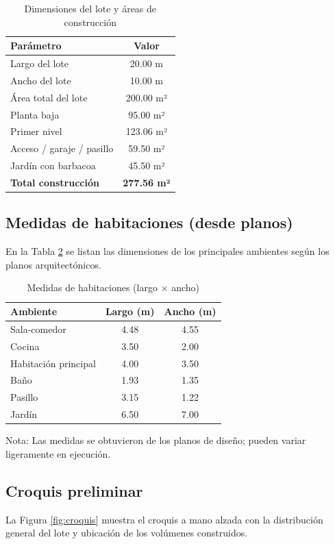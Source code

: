 \begin{table}[h]
\centering
\caption{Dimensiones del lote y áreas de construcción}
\label{tab:lot}
\begin{tabular}{|l|c|}
\hline
\textbf{Parámetro} & \textbf{Valor} \\
\hline
Largo del lote & 20.00 m \\
Ancho del lote & 10.00 m \\
Área total del lote & 200.00 m² \\
\hline
Planta baja & 95.00 m² \\
Primer nivel & 123.06 m² \\
Acceso / garaje / pasillo & 59.50 m² \\
Jardín con barbacoa & 45.50 m² \\
\textbf{Total construcción} & \textbf{277.56 m²} \\
\hline
\end{tabular}
\end{table}

\subsection{Medidas de habitaciones (desde planos)}
En la Tabla \ref{tab:medidas_habitaciones} se listan las dimensiones de los principales ambientes según los planos arquitectónicos.

\begin{table}[h]
\centering
\caption{Medidas de habitaciones (largo × ancho)}
\label{tab:medidas_habitaciones}
\begin{tabular}{|l|c|c|}
\hline
\textbf{Ambiente} & \textbf{Largo (m)} & \textbf{Ancho (m)} \\
\hline
Sala-comedor & 4.48 & 4.55 \\
Cocina & 3.50 & 2.00 \\
Habitación principal & 4.00 & 3.50 \\
Baño & 1.93 & 1.35 \\
Pasillo & 3.15 & 1.22 \\
Jardín & 6.50 & 7.00 \\
\hline
\end{tabular}
\end{table}
Nota: Las medidas se obtuvieron de los planos de diseño; pueden variar ligeramente en ejecución.

\subsection{Croquis preliminar}
La Figura \ref{fig:croquis} muestra el croquis a mano alzada con la distribución general del lote y ubicación de los volúmenes construidos.


